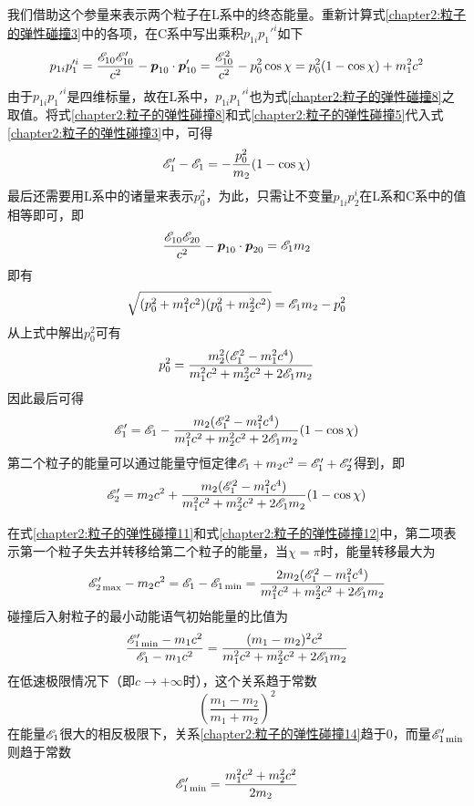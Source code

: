 我们借助这个参量来表示两个粒子在L系中的终态能量。重新计算式\eqref{chapter2:粒子的弹性碰撞3}中的各项，在C系中写出乘积$p_{1i}p_1'^i$如下
\begin{equation}
	p_{1i}p_1'^i = \frac{\mathscr{E}_{10}\mathscr{E}'_{10}}{c^2} - \boldsymbol{p}_{10}\cdot \boldsymbol{p}'_{10} = \frac{\mathscr{E}_{10}^2}{c^2} - p_0^2\cos \chi = p_0^2(1-\cos\chi)+m_1^2c^2
	\label{chapter2:粒子的弹性碰撞8}
\end{equation}
由于$p_{1i}p_1'^i$是四维标量，故在L系中，$p_{1i}p_1'^i$也为式\eqref{chapter2:粒子的弹性碰撞8}之取值。将式\eqref{chapter2:粒子的弹性碰撞8}和式\eqref{chapter2:粒子的弹性碰撞5}代入式\eqref{chapter2:粒子的弹性碰撞3}中，可得
\begin{equation}
	\mathscr{E}_1'-\mathscr{E}_1 = -\frac{p_0^2}{m_2}(1-\cos\chi)
	\label{chapter2:粒子的弹性碰撞9}
\end{equation}
最后还需要用L系中的诸量来表示$p_0^2$，为此，只需让不变量$p_{1i}p_2^i$在L系和C系中的值相等即可，即
\begin{equation*}
	\frac{\mathscr{E}_{10}\mathscr{E}_{20}}{c^2} - \boldsymbol{p}_{10}\cdot \boldsymbol{p}_{20} = \mathscr{E}_1m_2
\end{equation*}
即有
\begin{equation*}
	\sqrt{(p_0^2+m_1^2c^2)(p_0^2+m_2^2c^2)} = \mathscr{E}_1m_2 - p_0^2
\end{equation*}
从上式中解出$p_0^2$可有
\begin{equation}
	p_0^2 = \frac{m_2^2(\mathscr{E}_1^2-m_1^2c^4)}{m_1^2c^2+m_2^2c^2+2\mathscr{E}_1m_2}
	\label{chapter2:粒子的弹性碰撞10}
\end{equation}
因此最后可得
\begin{equation}
	\mathscr{E}_1' = \mathscr{E}_1 - \frac{m_2(\mathscr{E}_1^2-m_1^2c^4)}{m_1^2c^2+m_2^2c^2+2\mathscr{E}_1m_2}(1-\cos \chi)
	\label{chapter2:粒子的弹性碰撞11}
\end{equation}
第二个粒子的能量可以通过能量守恒定律$\mathscr{E}_1+m_2c^2=\mathscr{E}_1'+\mathscr{E}_2'$得到，即
\begin{equation}
	\mathscr{E}_2' = m_2c^2 + \frac{m_2(\mathscr{E}_1^2-m_1^2c^4)}{m_1^2c^2+m_2^2c^2+2\mathscr{E}_1m_2}(1-\cos \chi)
	\label{chapter2:粒子的弹性碰撞12}
\end{equation}

在式\eqref{chapter2:粒子的弹性碰撞11}和式\eqref{chapter2:粒子的弹性碰撞12}中，第二项表示第一个粒子失去并转移给第二个粒子的能量，当$\chi = \pi$时，能量转移最大为
\begin{equation}
	\mathscr{E}'_{2\max}-m_2c^2 = \mathscr{E}_1-\mathscr{E}_{1\min} = \frac{2m_2(\mathscr{E}_1^2-m_1^2c^4)}{m_1^2c^2+m_2^2c^2+2\mathscr{E}_1m_2}
	\label{chapter2:粒子的弹性碰撞13}
\end{equation}
碰撞后入射粒子的最小动能语气初始能量的比值为
\begin{equation}
	\frac{\mathscr{E}'_{1\min}-m_1c^2}{\mathscr{E}_1-m_1c^2} = \frac{(m_1-m_2)^2c^2}{m_1^2c^2+m_2^2c^2+2\mathscr{E}_1m_2}
	\label{chapter2:粒子的弹性碰撞14}
\end{equation}
在低速极限情况下（即$c\to +\infty$时），这个关系趋于常数
\begin{equation*}
	\left(\frac{m_1-m_2}{m_1+m_2}\right)^2
\end{equation*}
在能量$\mathscr{E}_1$很大的相反极限下，关系\eqref{chapter2:粒子的弹性碰撞14}趋于$0$，而量$\mathscr{E}'_{1\min}$则趋于常数
\begin{equation*}
	\mathscr{E}'_{1\min} = \frac{m_1^2c^2+m_2^2c^2}{2m_2}
\end{equation*}

